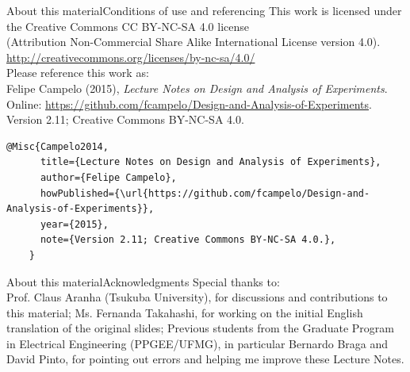 \documentclass[t]{beamer}
\begin{document}
\begin{ftstf}{About this material}{Conditions of use and referencing}
\centering\footnotesize This work is licensed under the Creative Commons CC BY-NC-SA 4.0 license\\(Attribution Non-Commercial Share Alike International License version 4.0).\\
\vhalf
\url{http://creativecommons.org/licenses/by-nc-sa/4.0/}\\
\vone
Please reference this work as:\\
\flushleft Felipe Campelo (2015), \textit{Lecture Notes on Design and Analysis of Experiments}.\\Online: \url{https://github.com/fcampelo/Design-and-Analysis-of-Experiments}.\\
Version 2.11; Creative Commons BY-NC-SA 4.0.\\

\begin{Verbatim}[fontsize=\scriptsize]
    @Misc{Campelo2014,
      title={Lecture Notes on Design and Analysis of Experiments},
      author={Felipe Campelo},
      howPublished={\url{https://github.com/fcampelo/Design-and-Analysis-of-Experiments}},
      year={2015},
      note={Version 2.11; Creative Commons BY-NC-SA 4.0.},
    }
\end{Verbatim}

\end{ftstf}


\begin{ftst}{About this material}{Acknowledgments}
\footnotesize Special thanks to:\\
\vhalf
\bitems Prof. Claus Aranha (Tsukuba University), for discussions and contributions to this material;
\spitem Ms. Fernanda Takahashi, for working on the initial English translation of the original slides;
\spitem Previous students from the Graduate Program in Electrical Engineering (PPGEE/UFMG), in particular Bernardo Braga and David Pinto, for pointing out errors and helping me improve these Lecture Notes.
\eitem
\end{ftst}
\end{document}
